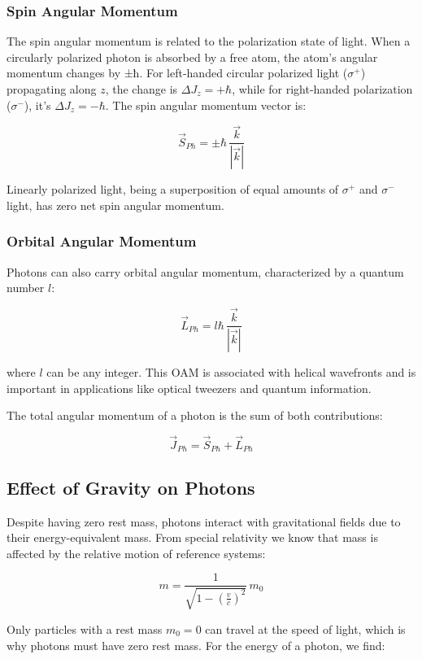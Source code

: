 \documentclass[
  a4paper,
]{book}
\begin{document}
\subsubsection{Spin Angular Momentum}\label{spin-angular-momentum}

The spin angular momentum is related to the polarization state of light.
When a circularly polarized photon is absorbed by a free atom, the
atom's angular momentum changes by ±ħ. For left-handed circular
polarized light (\(\sigma^{+}\)) propagating along \(z\), the change is
\(\Delta J_z = + \hbar\), while for right-handed polarization
(\(\sigma^{-}\)), it's \(\Delta J_z = - \hbar\). The spin angular
momentum vector is:

\[
\vec{S}_{Ph} = \pm \hbar \, \frac{\vec{k}}{\left| \vec{k} \right|}
\]

Linearly polarized light, being a superposition of equal amounts of
\(\sigma^{+}\) and \(\sigma^{-}\) light, has zero net spin angular
momentum.

\subsubsection{Orbital Angular Momentum}\label{orbital-angular-momentum}

Photons can also carry orbital angular momentum, characterized by a
quantum number \(l\):

\[
\vec{L}_{Ph} = l\hbar \, \frac{\vec{k}}{\left| \vec{k} \right|}
\]

where \(l\) can be any integer. This OAM is associated with helical
wavefronts and is important in applications like optical tweezers and
quantum information.

The total angular momentum of a photon is the sum of both contributions:

\[
\vec{J}_{Ph} = \vec{S}_{Ph} + \vec{L}_{Ph}
\]

\subsection{Effect of Gravity on
Photons}\label{effect-of-gravity-on-photons}

Despite having zero rest mass, photons interact with gravitational
fields due to their energy-equivalent mass. From special relativity we
know that mass is affected by the relative motion of reference systems:

\[
m = \frac{1}{\sqrt{1-\left( \frac{v}{c}\right)^2}} \, m_0
\]

Only particles with a rest mass \(m_0 = 0\) can travel at the speed of
light, which is why photons must have zero rest mass. For the energy of
a photon, we find:
\end{document}

